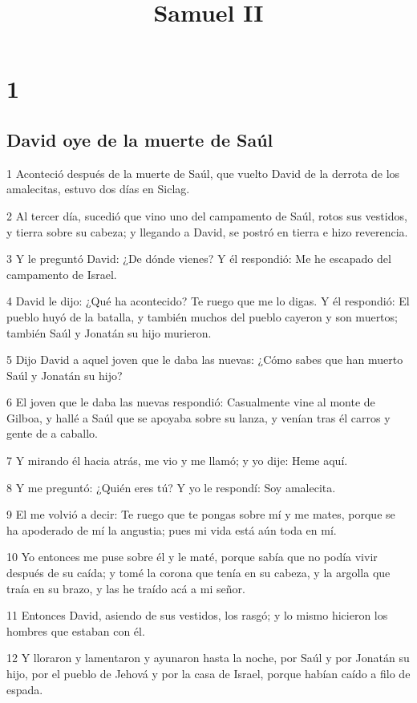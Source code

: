 

\title{Samuel II}

\chapter{1}

\section*{David oye de la muerte de Saúl}

\par 1 Aconteció después de la muerte de Saúl, que vuelto David de la derrota de los amalecitas, estuvo dos días en Siclag.
\par 2 Al tercer día, sucedió que vino uno del campamento de Saúl, rotos sus vestidos, y tierra sobre su cabeza; y llegando a David, se postró en tierra e hizo reverencia.
\par 3 Y le preguntó David: ¿De dónde vienes? Y él respondió: Me he escapado del campamento de Israel.
\par 4 David le dijo: ¿Qué ha acontecido? Te ruego que me lo digas. Y él respondió: El pueblo huyó de la batalla, y también muchos del pueblo cayeron y son muertos; también Saúl y Jonatán su hijo murieron.
\par 5 Dijo David a aquel joven que le daba las nuevas: ¿Cómo sabes que han muerto Saúl y Jonatán su hijo?
\par 6 El joven que le daba las nuevas respondió: Casualmente vine al monte de Gilboa, y hallé a Saúl que se apoyaba sobre su lanza, y venían tras él carros y gente de a caballo.
\par 7 Y mirando él hacia atrás, me vio y me llamó; y yo dije: Heme aquí.
\par 8 Y me preguntó: ¿Quién eres tú? Y yo le respondí: Soy amalecita.
\par 9 El me volvió a decir: Te ruego que te pongas sobre mí y me mates, porque se ha apoderado de mí la angustia; pues mi vida está aún toda en mí.
\par 10 Yo entonces me puse sobre él y le maté, porque sabía que no podía vivir después de su caída; y tomé la corona que tenía en su cabeza, y la argolla que traía en su brazo, y las he traído acá a mi señor. 
\par 11 Entonces David, asiendo de sus vestidos, los rasgó; y lo mismo hicieron los hombres que estaban con él.
\par 12 Y lloraron y lamentaron y ayunaron hasta la noche, por Saúl y por Jonatán su hijo, por el pueblo de Jehová y por la casa de Israel, porque habían caído a filo de espada.

